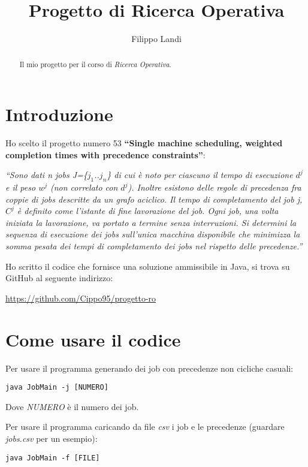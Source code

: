 \documentclass[12pt, letterpaper]{article}
\title{Progetto di Ricerca Operativa}
\author{Filippo Landi}
\begin{document}
\maketitle
\begin{abstract}
Il mio progetto per il corso di \textit{Ricerca Operativa}.
\end{abstract}

\section{Introduzione}
Ho scelto il progetto numero 53 \textbf{``Single machine scheduling, weighted completion times with precedence constraints''}:

\medskip
\textit{``Sono dati n jobs J=\{$j_1$..$j_n$\} di cui è noto per ciascuno il tempo di esecuzione $d^j$ e il peso $w^j$ (non correlato con $d^j$). Inoltre esistono delle regole di precedenza fra coppie di jobs descritte da un grafo aciclico. Il tempo di completamento del job j, $C^j$ è definito come l’istante di fine lavorazione del job. Ogni job, una volta iniziata la lavorazione, va portato a termine senza interruzioni. Si determini la sequenza di esecuzione dei jobs sull’unica macchina disponibile che minimizza la somma pesata dei tempi di completamento dei jobs nel rispetto delle precedenze.''}
\medskip

Ho scritto il codice che fornisce una soluzione ammissibile in Java, si trova su GitHub al seguente indirizzo:

\medskip
\url{https://github.com/Cippo95/progetto-ro}

\section{Come usare il codice}

Per usare il programma generando dei job con precedenze non cicliche casuali:

\begin{verbatim}
java JobMain -j [NUMERO]
\end{verbatim}

Dove \textit{NUMERO} è il numero dei job.
\medskip

\noindent Per usare il programma caricando da file \textit{csv} i job e le precedenze (guardare \textit{jobs.csv} per un esempio):

\begin{verbatim}
java JobMain -f [FILE]
\end{verbatim}
\end{document}
